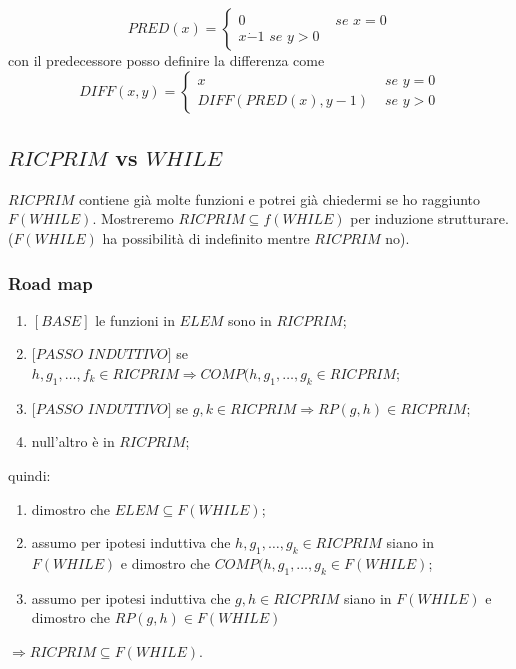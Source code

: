 \documentclass{article}
\begin{document}
\begin{displaymath}
	PRED(x)=
	\begin{cases}
		0 &\textit{ se } x=0  \\
		x \dot{-} 1 \textit{ se } y>0
	\end{cases}
\end{displaymath}
con il predecessore posso definire la differenza come
\begin{displaymath}
	DIFF(x,y)=
	\begin{cases}
		x &\textit{ se } y=0  \\
		DIFF(PRED(x),y-1) &\textit{ se } y>0
	\end{cases}
\end{displaymath}

\subsection{$RICPRIM$ vs $WHILE$}
$RICPRIM$ contiene già molte funzioni e potrei già chiedermi se ho raggiunto $F(WHILE)$. Mostreremo $RICPRIM \subseteq f(WHILE)$ per induzione strutturare. ($F(WHILE)$ ha possibilità di indefinito mentre $RICPRIM$ no).

\subsubsection{Road map}
\begin{enumerate}
	\item $[BASE]$ le funzioni in $ELEM$ sono in $RICPRIM$;
	\item $[PASSO$ $INDUTTIVO]$ se $h,g_1,\dots,f_k \in RICPRIM \Rightarrow COMP(h,g_1,\dots,g_k \in RICPRIM$;
	\item $[PASSO$ $INDUTTIVO]$ se $g,k \in RICPRIM \Rightarrow RP(g,h) \in RICPRIM$;
	\item null'altro è in $RICPRIM$;
\end{enumerate}
quindi:
\begin{enumerate}
	\item dimostro che $ELEM \subseteq F(WHILE)$;
	\item assumo per ipotesi induttiva che $h,g_1,\dots, g_k \in RICPRIM$ siano in $F(WHILE)$ e dimostro che $COMP(h,g_1,\dots,g_k \in F(WHILE)$;
	\item assumo per ipotesi induttiva che $g,h \in RICPRIM$ siano in $F(WHILE)$ e dimostro che $RP(g,h) \in F(WHILE)$
	
\end{enumerate}
$\Rightarrow RICPRIM \subseteq F(WHILE)$.
\end{document}
